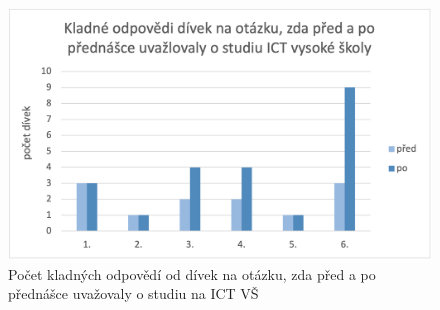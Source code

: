 \documentclass[12pt]{report}			%
\begin{document}
                \begin{figure}[h]
                    \centering
                    \includegraphics[width=16cm]{Maturitni Prace/images/divky_uvazovani.png} 
                    \caption{Počet kladných odpovědí od dívek na otázku, zda před a po přednášce uvažovaly o studiu na ICT VŠ}
                    \label{fig:divky_uvazovani}
                \end{figure} 
                
\end{document}
